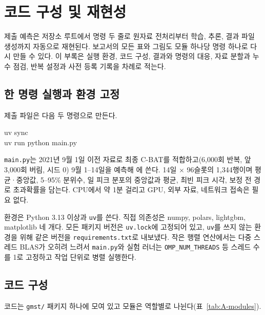 \section{코드 구성 및 재현성}
\label{app:repro}

제출 예측은 저장소 루트에서 명령 두 줄로 원자료 전처리부터 학습, 추론, 결과 파일 생성까지 자동으로 재현된다. 보고서의 모든 표와 그림도 모듈 하나당 명령 하나로 다시 만들 수 있다. 이 부록은 실행 환경, 코드 구성, 결과와 명령의 대응, 자료 분할과 누수 점검, 반복 설정과 사전 등록 기록을 차례로 적는다.

\subsection{한 명령 실행과 환경 고정}

제출 파일은 다음 두 명령으로 만든다.

\begin{flushleft}\ttfamily\small
uv sync\\
uv run python main.py
\end{flushleft}

\texttt{main.py}는 2021년 9월 1일 이전 자료로 최종 C-BAT를 적합하고(6,000회 반복, 앞 3,000회 버림, 시드 0) 9월 1--14일을 예측해 에 쓴다. 14일 $\times$ 96슬롯의 1,344행이며 평균·중앙값, 5--95\% 분위수, 일 피크 분포의 중앙값과 평균, 최빈 피크 시각, 보정 전 경로 초과확률을 담는다. CPU에서 약 1분 걸리고 GPU, 외부 자료, 네트워크 접속은 필요 없다.

환경은 Python 3.13 이상과 \texttt{uv}를 쓴다. 직접 의존성은 numpy, polars, lightgbm, matplotlib 네 개다. 모든 패키지 버전은 \texttt{uv.lock}에 고정되어 있고, \texttt{uv}를 쓰지 않는 환경을 위해 같은 버전을 \texttt{requirements.txt}로 내보냈다. 작은 행렬 연산에서는 다중 스레드 BLAS가 오히려 느려서 \texttt{main.py}와 실험 러너는 \texttt{OMP\_NUM\_THREADS} 등 스레드 수를 1로 고정하고 작업 단위로 병렬 실행한다.

\subsection{코드 구성}

코드는 \texttt{gmst/} 패키지 하나에 모여 있고 모듈은 역할별로 나뉜다(표~\ref{tab:A-modules}).


